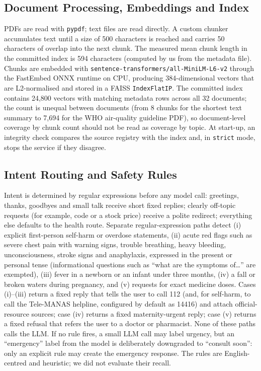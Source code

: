 \documentclass[10pt,a4paper]{article}
\newcommand{\code}[1]{\texttt{\small #1}}
\begin{document}
\subsection{Document Processing, Embeddings and Index}
PDFs are read with \code{pypdf}; text files are read directly. A custom chunker accumulates text until a size of 500 characters is reached and carries 50 characters of overlap into the next chunk. The measured mean chunk length in the committed index is 594 characters (computed by us from the metadata file). Chunks are embedded with \code{sentence-transformers/all-MiniLM-L6-v2} through the FastEmbed ONNX runtime on CPU, producing 384-dimensional vectors that are L2-normalised and stored in a FAISS \code{IndexFlatIP}. The committed index contains 24,800 vectors with matching metadata rows across all 32 documents; the count is unequal between documents (from 8 chunks for the shortest text summary to 7,694 for the WHO air-quality guideline PDF), so document-level coverage by chunk count should not be read as coverage by topic. At start-up, an integrity check compares the source registry with the index and, in \code{strict} mode, stops the service if they disagree.

\subsection{Intent Routing and Safety Rules}
Intent is determined by regular expressions before any model call: greetings, thanks, goodbyes and small talk receive short fixed replies; clearly off-topic requests (for example, code or a stock price) receive a polite redirect; everything else defaults to the health route. Separate regular-expression paths detect (i) explicit first-person self-harm or overdose statements, (ii) acute red flags such as severe chest pain with warning signs, trouble breathing, heavy bleeding, unconsciousness, stroke signs and anaphylaxis, expressed in the present or personal tense (informational questions such as ``what are the symptoms of\ldots'' are exempted), (iii) fever in a newborn or an infant under three months, (iv) a fall or broken waters during pregnancy, and (v) requests for exact medicine doses. Cases (i)--(iii) return a fixed reply that tells the user to call 112 (and, for self-harm, to call the Tele-MANAS helpline, configured by default as 14416) and attach official-resource sources; case (iv) returns a fixed maternity-urgent reply; case (v) returns a fixed refusal that refers the user to a doctor or pharmacist. None of these paths calls the LLM. If no rule fires, a small LLM call may label urgency, but an ``emergency'' label from the model is deliberately downgraded to ``consult soon'': only an explicit rule may create the emergency response. The rules are English-centred and heuristic; we did not evaluate their recall.
\end{document}
